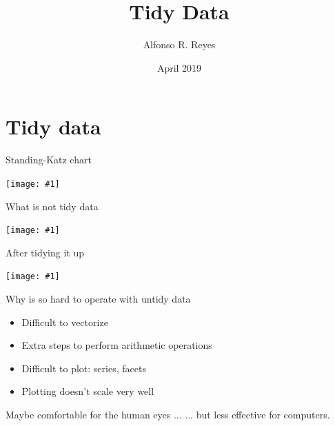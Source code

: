 \documentclass[14pt,ignorenonframetext,]{beamer}
\title{Tidy Data}
\author{Alfonso R. Reyes}
\date{April 2019}
\providecommand{\tightlist}{%
  \setlength{\itemsep}{0pt}\setlength{\parskip}{0pt}}
\def\fullwidth#1{\vspace*{-0.2cm}\par\centerline{\texttt{[image: \#1]}}}
\begin{document}
\frame{\titlepage}

\hypertarget{tidy-data}{%
\section{Tidy data}\label{tidy-data}}

\begin{frame}{Standing-Katz chart}
\protect\hypertarget{standing-katz-chart}{}

\fullwidth{standing-katz-plot}

\end{frame}

\begin{frame}{What is not tidy data}
\protect\hypertarget{what-is-not-tidy-data}{}

\fullwidth{zfactor_rawdata}

\end{frame}

\begin{frame}{After tidying it up}
\protect\hypertarget{after-tidying-it-up}{}

\fullwidth{zfactor_tidy}

\end{frame}

\begin{frame}{Why is so hard to operate with untidy data}
\protect\hypertarget{why-is-so-hard-to-operate-with-untidy-data}{}

\begin{itemize}
\tightlist
\item
  Difficult to vectorize
\item
  Extra steps to perform arithmetic operations
\item
  Difficult to plot: series, facets
\item
  Plotting doesn't scale very well
\end{itemize}

\vspace{1.2cm}

\begin{alertblock}{}
Maybe comfortable for the human eyes ... \newline
... but less effective for computers.
\end{alertblock}

\end{frame}
\end{document}

